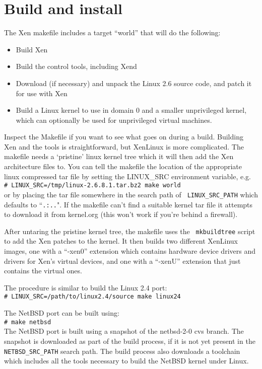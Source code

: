 \documentclass[11pt,twoside,final,openright]{xenstyle}
\begin{document}
\section{Build and install}

The Xen makefile includes a target ``world'' that will do the
following:

\begin{itemize}
\item Build Xen
\item Build the control tools, including Xend
\item Download (if necessary) and unpack the Linux 2.6 source code,
      and patch it for use with Xen
\item Build a Linux kernel to use in domain 0 and a smaller
      unprivileged kernel, which can optionally be used for
      unprivileged virtual machines.
\end{itemize}

Inspect the Makefile if you want to see what goes on during a build.
Building Xen and the tools is straightforward, but XenLinux is more
complicated.  The makefile needs a `pristine' linux kernel tree which
it will then add the Xen architecture files to.  You can tell the
makefile the location of the appropriate linux compressed tar file by
setting the LINUX\_SRC environment variable, e.g. \\
\verb!# LINUX_SRC=/tmp/linux-2.6.8.1.tar.bz2 make world! \\ or by
placing the tar file somewhere in the search path of {\tt
LINUX\_SRC\_PATH} which defaults to ``{\tt .:..}".  If the makefile
can't find a suitable kernel tar file it attempts to download it from
kernel.org (this won't work if you're behind a firewall).

After untaring the pristine kernel tree, the makefile uses the {\tt
mkbuildtree} script to add the Xen patches to the kernel.  It then
builds two different XenLinux images, one with a ``-xen0'' extension
which contains hardware device drivers and drivers for Xen's virtual
devices, and one with a ``-xenU'' extension that just contains the
virtual ones.

The procedure is similar to build the Linux 2.4 port: \\
\verb!# LINUX_SRC=/path/to/linux2.4/source make linux24!

The NetBSD port can be built using: \\ \verb!# make netbsd! \\ The
NetBSD port is built using a snapshot of the netbsd-2-0 cvs branch.
The snapshot is downloaded as part of the build process, if it is not
yet present in the {\tt NETBSD\_SRC\_PATH} search path.  The build
process also downloads a toolchain which includes all the tools
necessary to build the NetBSD kernel under Linux.
\end{document}

